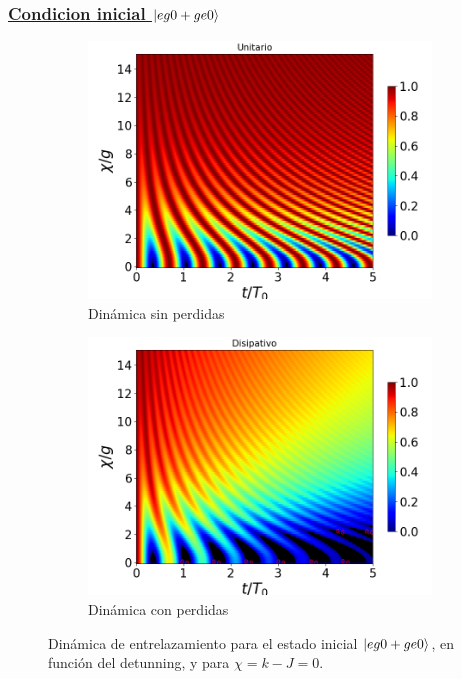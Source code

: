 \subsubsection{\underline{Condicion inicial $\ket{eg0+ge0}$}}
\begin{figure}[h]
    \centering
    \begin{subfigure}{0.49\textwidth}
        \includegraphics[width=\textwidth]{figuras/ch4/concu/chi/eg0+ge0 d=0.0g k=0.0g J=0.0g gamma=0.25g concu chi uni.png}
        \caption{Dinámica sin perdidas}
        \label{fig4:concu x 0 uni}
    \end{subfigure}
    \hfill
    \begin{subfigure}{0.49\textwidth}
        \includegraphics[width=\textwidth]{figuras/ch4/concu/chi/eg0+ge0 d=0.0g k=0.0g J=0.0g gamma=0.25g concu chi dis.png}
        \caption{Dinámica con perdidas}
        \label{fig4:concu x 0 dis}
    \end{subfigure}
    \caption{Dinámica de entrelazamiento para el estado inicial $\ket{eg0+ge0}$, en función del detunning, y para $\chi=k-J=0$.}
    \label{fig4:concu x 0}
\end{figure}

